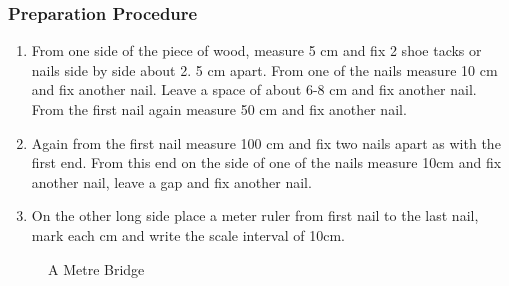 \subsubsection*{Preparation Procedure}
\begin{enumerate}
\item{From one side of the piece of wood, measure 5 cm and fix 2 shoe tacks or nails side by side about 2.  5 cm apart. From one of the nails measure 10 cm and fix another nail. Leave a space of about 6-8 cm and fix another nail. From the first nail again measure 50 cm and fix another nail.} 
\item{Again from the first nail measure 100 cm and fix two nails apart as with the first end. From this end on the side of one of the nails measure 10cm and fix another nail, leave a gap and fix another nail.} 
\item{On the other long side place a meter ruler from first nail to the last nail, mark each cm and write the scale interval of 10cm.} 
\end{enumerate}

\begin{figure}
\begin{center}
\def\svgwidth{8cm}

\caption{A Metre Bridge}
\label{fig:metre-bridge}
\end{center}
\end{figure}


